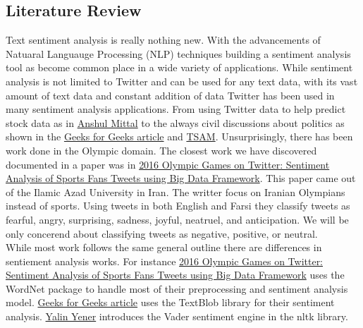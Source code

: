 \documentclass[12pt]{article}
\begin{document}
        \subsection{Literature Review}
            Text sentiment analysis is really nothing new. With the advancements of Natuaral Languauge Processing (NLP) techniques building a sentiment analysis tool as become common place in a 
            wide variety of applications. While sentiment analysis is not limited to Twitter and can be used for any text data, with its vast amount of text data and constant addition of data 
            Twitter has been used in many sentiment analysis applications. From using Twitter data to help predict stock data as in 
            \href{http://cs229.stanford.edu/proj2011/GoelMittal-StockMarketPredictionUsingTwitterSentimentAnalysis.pdf}{Anshul Mittal} to the always civil discussions about politics as shown in 
            the \href{https://www.geeksforgeeks.org/twitter-sentiment-analysis-using-python/}{Geeks for Geeks article} and 
            \href{https://ieeexplore.ieee.org/abstract/document/6581022?casa_token=qrfkpDZP30sAAAAA:PNpsFf2_T9jXUB81SKLMldZji2tDprsCz4Ec4QSrHxlJQNIW3Yi52tWHZ4jhfTgPrqRjzjdKBfA}{TSAM}. 
            Unsurprisingly, there has been work done in the Olympic domain. The closest work we have discovered documented in a paper was in 
            \href{https://raw.githubusercontent.com/cvorsanger/COMP-4447-Final-Project/master/Literature%20Review/JACET_Volume%205_Issue%203_Page%20143-160.pdf}{2016 Olympic Games on Twitter: Sentiment Analysis of Sports Fans Tweets using Big Data Framework}.
            This paper came out of the Ilamic Azad University in Iran. The writter focus on Iranian Olympians instead of sports. Using tweets in both English and Farsi they classify tweets as 
            fearful, angry, surprising, sadness, joyful, neatruel, and anticipation. We will be only concerend about classifying tweets as negative, positive, or neutral.\\

            While most work follows the same general outline there are differences in sentiement analysis works. For instance 
            \href{https://raw.githubusercontent.com/cvorsanger/COMP-4447-Final-Project/master/Literature%20Review/JACET_Volume%205_Issue%203_Page%20143-160.pdf}{2016 Olympic Games on Twitter: Sentiment Analysis of Sports Fans Tweets using Big Data Framework}
            uses the WordNet package to handle most of their preprocessing and sentiment analysis model. 
            \href{https://www.geeksforgeeks.org/twitter-sentiment-analysis-using-python/}{Geeks for Geeks article} uses the TextBlob library for their sentiment analysis. 
            \href{https://towardsdatascience.com/step-by-step-twitter-sentiment-analysis-in-python-d6f650ade58d}{Yalin Yener} introduces the Vader sentiment engine in the nltk library.\\
\end{document}
